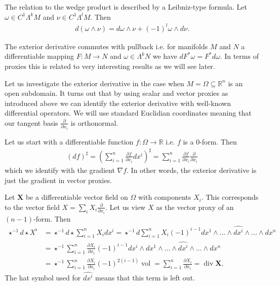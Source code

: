 \documentclass[12pt,a4paper]{article}
\numberwithin{equation}{subsection}
\numberwithin{lemma}{subsection}
\theoremstyle{definition}
\DeclareMathOperator{\diver}{div}
\DeclareMathOperator{\vol}{vol}
\newcommand{\real}{\mathbb{R}}
\begin{document}
The relation to the wedge product is described by a Leibniz-type formula. 
Let $\omega \in C^1 \Lambda^k M$ and $\nu \in C^1 \Lambda^l M$. Then
\begin{align}
    d (\omega \wedge \nu) = d\omega \wedge \nu + (-1)^l \omega \wedge d\nu.
    \label{eq:leibniz_formula}
\end{align}

The exterior derivative commutes with pullback i.e. 
for manifolds $M$ and $N$ a differentiable mapping $F:M \rightarrow N$ 
and $\omega \in \Lambda^k N$ we have $dF^* \omega = F^* d\omega$. 
In terms of proxies this is related to very interesting results as we will 
see later. 


Let us investigate the exterior derivative in the case when 
$M = \Omega \subseteq \real^n$ is an open subdomain. It turns out that by using 
scalar and vector proxies as introduced above we can identify the exterior 
derivative with well-known differential operators. We will use standard 
Euclidian coordinates meaning that our tangent basis $\frac{\partial}{\partial x_i}$
is orthonormal. 

Let us start with a differentiable function $f: \Omega \rightarrow \real$ i.e. 
$f$ is a $0$-form. Then
\begin{align*}
    (df)^\sharp = \left( \sum_{i=1}^n \frac{\partial f}{\partial x_i} dx^i 
        \right)^\sharp
    = \sum_{i=1}^n \frac{\partial f}{\partial x_i} \frac{\partial}{\partial x_i}
\end{align*}
which we identify with the gradient $\nabla f$. In other words, 
the exterior derivative is just the gradient in vector proxies.

Let $\mathbf{X}$ be a differentiable vector field on $\Omega$ 
with components $X_i$. This corresponds to the vector field 
$X = \sum_i X_i \frac{\partial}{\partial x_i}$. Let us view
$X$ as the vector proxy 
of an $(n-1)$-form. Then 
\begin{align*}
    \star^{-1} d\star X^\flat &= \star^{-1} d\star \sum_{i=1}^n X_i dx^i
    = \star^{-1} d \sum_{i=1}^n X_i (-1)^{i-1} 
        dx^1 \wedge ... \wedge \widehat{dx^i} 
        \wedge ... 
        \wedge dx^n
    \\ &= \star^{-1} \sum_{i=1}^n \frac{\partial X_i}{\partial x_i} (-1)^{i-1} 
        dx^i \wedge 
        dx^1 \wedge ... \wedge \widehat{dx^i} \wedge ... \wedge dx^n
    \\ &= \star^{-1} \sum_{i=1}^n \frac{\partial X_i}{\partial x_i} 
        (-1)^{2(i-1)} \vol
    = \sum_{i=1}^n \frac{\partial X_i}{\partial x_i}
    = \diver \mathbf{X}.
\end{align*}
The hat symbol used for
$\widehat{dx^i}$ means that this term is left out. 
\end{document}
